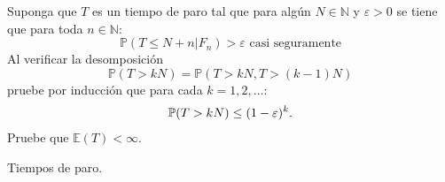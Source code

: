 \begin{problema}
		Suponga que \(T\) es un tiempo de paro tal que para algún 
		\(N\in\mathbb{N}\) y \(\varepsilon>0\) se tiene que para toda \(n\in\mathbb{N}\):
		\begin{equation}\label{problema1_2:hipotesis_del_problema}
		\mathbb{P} (T \leq N + n | F_n) > \varepsilon \text{ casi seguramente}
		\end{equation}
		Al verificar la desomposici\'on
		\begin{equation}\label{problema1_2:sugerencia_del_problema}
			\mathbb{P} (T>kN)= \mathbb{P} (T>kN,T>(k-1)N)
		\end{equation}
		pruebe por inducci\'on que para cada \(k=1,2,\ldots\):
		\begin{align}
			\mathbb{P}(T>kN)\leq (1-\varepsilon)^k.
		\end{align}
		Pruebe que \( \mathbb{E}(T)<\infty \). 
	\begin{categoria} Tiempos de paro.\end{categoria}
\end{problema}

